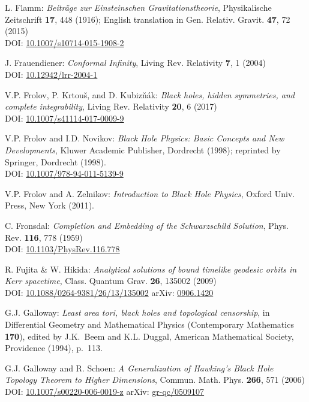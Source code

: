 \begin{thebibliography}{123}
L. Flamm: {\em Beiträge zur Einsteinschen Gravitationstheorie},
Physikalische Zeitschrift {\bf 17}, 448 (1916); English translation in
Gen. Relativ. Gravit. {\bf 47}, 72 (2015)\\
DOI: \href{https://doi.org/10.1007/s10714-015-1908-2}{10.1007/s10714-015-1908-2}

J. Frauendiener:
{\em Conformal Infinity},
Living Rev. Relativity {\bf 7}, 1 (2004) \\
DOI: \href{https://doi.org/10.12942/lrr-2004-1}{10.12942/lrr-2004-1}

V.P. Frolov, P. Krtouš, and D. Kubizňák:
{\em Black holes, hidden symmetries, and complete integrability},
Living Rev. Relativity {\bf 20}, 6 (2017) \\
DOI: \href{https://doi.org/10.1007/s41114-017-0009-9}{10.1007/s41114-017-0009-9}

V.P. Frolov and I.D. Novikov: {\em Black Hole Physics:
Basic Concepts and New Developments},
Kluwer Academic Publisher, Dordrecht (1998); reprinted by
Springer, Dordrecht (1998). \\
DOI: \href{https://doi.org/10.1007/978-94-011-5139-9}{10.1007/978-94-011-5139-9}

V.P. Frolov and A. Zelnikov: {\em Introduction to Black Hole Physics},
Oxford Univ. Press, New York (2011).

C. Fronsdal: {\em Completion and Embedding of the Schwarzschild Solution},
Phys. Rev. {\bf 116}, 778 (1959) \\
DOI: \href{https://doi.org/10.1103/PhysRev.116.778}{10.1103/PhysRev.116.778}

R. Fujita \& W. Hikida:
{\em Analytical solutions of bound timelike geodesic orbits in Kerr spacetime},
Class. Quantum Grav. {\bf 26}, 135002 (2009) \\
DOI: \href{https://doi.org/10.1088/0264-9381/26/13/135002}{10.1088/0264-9381/26/13/135002}\hfill
arXiv: \href{https://arxiv.org/abs/0906.1420}{0906.1420}

G.J. Galloway:
{\em Least area tori, black holes and topological censorship},
in {\rm Differential Geometry and Mathematical Physics}
(Contemporary Mathematics {\bf 170}),
edited by  J.K.~Beem and K.L. Duggal,
American Mathematical Society, Providence (1994), p.~113.

G.J. Galloway and R. Schoen:
{\em A Generalization of Hawking’s Black Hole Topology Theorem to Higher Dimensions},
Commun. Math. Phys. {\bf 266}, 571 (2006)\\
DOI: \href{https://doi.org/10.1007/s00220-006-0019-z}{10.1007/s00220-006-0019-z}\hfill
arXiv: \href{https://arxiv.org/abs/gr-qc/0509107}{gr-qc/0509107}


\end{thebibliography}
